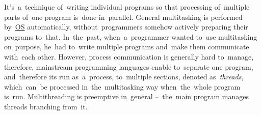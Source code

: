 \enlargethispage{10mm}
\label{multithreading}
It's~a~technique of~writing individual programs so that processing of~multiple parts of~one program is~done in~parallel.
General multitasking is performed by~\hyperref[os]{OS} automatically, without~programmers somehow actively preparing their programs to~that.
In~the~past, when~a~programmer wanted to~use multitasking on~purpose, he~had to~write multiple programs and~make them communicate with~each other.
However, process communication is generally hard to~manage, therefore, mainstream programming languages enable to~separate one program, and~therefore its run as~a~process, to~multiple sections, denoted \mbox{as \textit{threads}}, which~can~be processed in~the~multitasking way when~the~whole program is~run.
Multithreading is preemptive in~general --~the~main program manages threads branching from~it.
\newpage
